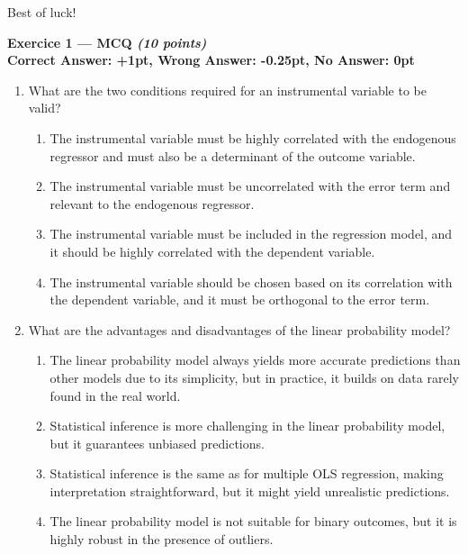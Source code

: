 \documentclass{article}
\begin{document}
\vspace{1cm}

Best of luck!

\newpage

\textbf{Exercice 1 --- MCQ \textit{(10 points)}}\\[1em]
\textbf{Correct Answer: +1pt, Wrong Answer: -0.25pt, No Answer: 0pt}\\[1em]


\begin{enumerate}[label=\textbf{\arabic*.}]

    \item What are the two conditions required for an instrumental variable to be valid?
    \begin{enumerate}[label=\Alph*)]
        \item The instrumental variable must be highly correlated with the endogenous regressor and must also be a determinant of the outcome variable.
        \item The instrumental variable must be uncorrelated with the error term and relevant to the endogenous regressor. %
        \item The instrumental variable must be included in the regression model, and it should be highly correlated with the dependent variable.
        \item The instrumental variable should be chosen based on its correlation with the dependent variable, and it must be orthogonal to the error term.
    \end{enumerate}

    \item What are the advantages and disadvantages of the linear probability model?
    \begin{enumerate}[label=\Alph*)]
        \item The linear probability model always yields more accurate predictions than other models due to its simplicity, but in practice, it builds on data rarely found in the real world.
        \item Statistical inference is more challenging in the linear probability model, but it guarantees unbiased predictions.
        \item Statistical inference is the same as for multiple OLS regression, making interpretation straightforward, but it might yield unrealistic predictions. %
        \item The linear probability model is not suitable for binary outcomes, but it is highly robust in the presence of outliers.
    \end{enumerate}


\end{enumerate}
\end{document}

